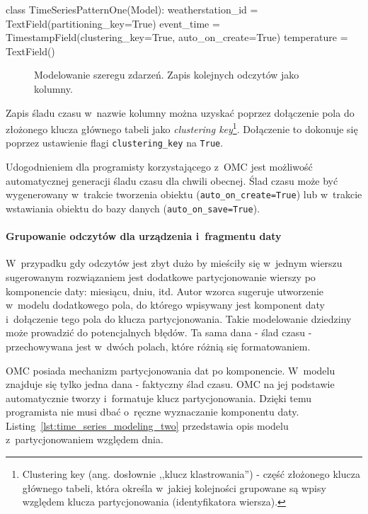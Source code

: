 \begin{verbbox}
class TimeSeriesPatternOne(Model):
    weatherstation_id = TextField(partitioning_key=True)
    event_time = TimestampField(clustering_key=True, auto_on_create=True)
    temperature = TextField()
\end{verbbox}

\begin{figure}[ht!]
	\centering
	\theverbbox
	\caption{Modelowanie szeregu zdarzeń. Zapis kolejnych odczytów jako kolumny.}
	\label{lst:time_series_modeling_one}
\end{figure}

Zapis śladu czasu w~nazwie kolumny można uzyskać poprzez dołączenie pola do złożonego klucza głównego tabeli jako \emph{clustering key}\footnote{Clustering key (ang. dosłownie ,,klucz klastrowania'') - część złożonego klucza głównego tabeli, która określa w~jakiej kolejności grupowane są wpisy względem klucza partycjonowania (identyfikatora wiersza).}. Dołączenie to dokonuje się poprzez ustawienie flagi \verb+clustering_key+ na \verb+True+. 

Udogodnieniem dla programisty korzystającego z~OMC jest możliwość automatycznej generacji śladu czasu dla chwili obecnej. Ślad czasu może być wygenerowany w~trakcie tworzenia obiektu (\verb+auto_on_create=True+) lub w~trakcie wstawiania obiektu do bazy danych (\verb+auto_on_save=True+).  

\paragraph{Grupowanie odczytów dla urządzenia i~fragmentu daty} 

W~przypadku gdy odczytów jest zbyt dużo by mieściły się w~jednym wierszu sugerowanym rozwiązaniem jest dodatkowe partycjonowanie wierszy po komponencie daty: miesiącu, dniu, itd. Autor wzorca sugeruje utworzenie w~modelu dodatkowego pola, do którego wpisywany jest komponent daty i~dołączenie tego pola do klucza partycjonowania. Takie modelowanie dziedziny może prowadzić do potencjalnych błędów. Ta sama dana - ślad czasu - przechowywana jest w~dwóch polach, które różnią się formatowaniem. 

OMC posiada mechanizm partycjonowania dat po komponencie. W~modelu znajduje się tylko jedna dana - faktyczny ślad czasu. OMC na jej podstawie automatycznie tworzy i~formatuje klucz partycjonowania. Dzięki temu programista nie musi dbać o~ręczne wyznaczanie komponentu daty. Listing~\ref{lst:time_series_modeling_two} przedstawia opis modelu z~partycjonowaniem względem dnia.

